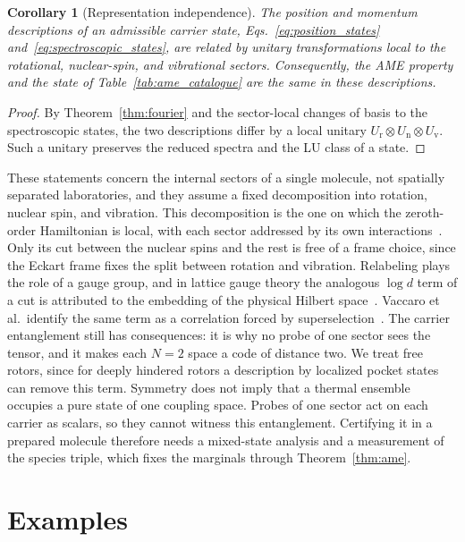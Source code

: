 \documentclass[
  reprint,
  aps,
  prx,
  superscriptaddress,
  amsmath,
  amssymb,
  longbibliography
]{revtex4-2}
\newtheorem{corollary}{Corollary}
\begin{document}
\begin{corollary}[Representation independence]
\label{cor:rep_independence}
The position and momentum descriptions of an admissible carrier state, Eqs.~\eqref{eq:position_states} and~\eqref{eq:spectroscopic_states}, are related by unitary transformations local to the rotational, nuclear-spin, and vibrational sectors. Consequently, the AME property and the state of Table~\ref{tab:ame_catalogue} are the same in these descriptions.
\end{corollary}

\begin{proof}
By Theorem~\ref{thm:fourier} and the sector-local changes of basis to the spectroscopic states, the two descriptions differ by a local unitary $U_{\mathrm r}\otimes U_{\mathrm n}\otimes U_{\mathrm v}$. Such a unitary preserves the reduced spectra and the LU class of a state.
\end{proof}

These statements concern the internal sectors of a single molecule, not spatially separated laboratories, and they assume a fixed decomposition into rotation, nuclear spin, and vibration. This decomposition is the one on which the zeroth-order Hamiltonian is local, with each sector addressed by its own interactions~\cite{ZanardiLidarLloyd2004}. Only its cut between the nuclear spins and the rest is free of a frame choice, since the Eckart frame fixes the split between rotation and vibration. Relabeling plays the role of a gauge group, and in lattice gauge theory the analogous $\log d$ term of a cut is attributed to the embedding of the physical Hilbert space~\cite{VanAcoleyen2016}. Vaccaro et al.\ identify the same term as a correlation forced by superselection~\cite{Vaccaro2008}. The carrier entanglement still has consequences: it is why no probe of one sector sees the tensor, and it makes each $N=2$ space a code of distance two. We treat free rotors, since for deeply hindered rotors a description by localized pocket states~\cite{Huller1977} can remove this term. Symmetry does not imply that a thermal ensemble occupies a pure state of one coupling space. Probes of one sector act on each carrier as scalars, so they cannot witness this entanglement. Certifying it in a prepared molecule therefore needs a mixed-state analysis and a measurement of the species triple, which fixes the marginals through Theorem~\ref{thm:ame}.

\section{Examples}
\label{sec:examples}
\end{document}
